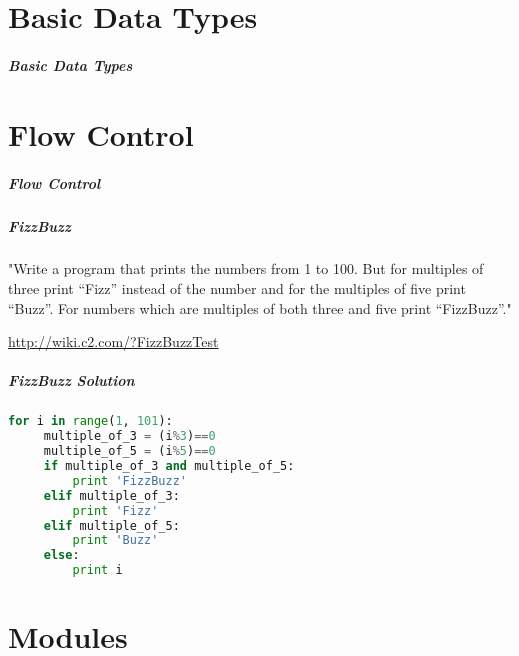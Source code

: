 \documentclass[hyperref={colorlinks, linkcolor=blue, urlcolor=blue}]{beamer}
\begin{document}
\part{Basic Data Types} 

\begin{frame}
  \frametitle{Basic Data Types}
\end{frame}

\part{Flow Control} 

\begin{frame}
  \frametitle{Flow Control}
\end{frame}

\begin{frame}
  \frametitle{FizzBuzz}

  "Write a program that prints the numbers from 1 to 100. But for multiples of three print “Fizz”
  instead of the number and for the multiples of five print “Buzz”. For numbers which are multiples
  of both three and five print “FizzBuzz”."

  \url{http://wiki.c2.com/?FizzBuzzTest}
\end{frame}

\begin{frame}[fragile]
  \frametitle{FizzBuzz Solution}
  \begin{lstlisting}[language=Python]
 for i in range(1, 101):
     multiple_of_3 = (i%3)==0
     multiple_of_5 = (i%5)==0
     if multiple_of_3 and multiple_of_5:
         print 'FizzBuzz'
     elif multiple_of_3:
         print 'Fizz'
     elif multiple_of_5:
         print 'Buzz'
     else:
         print i
  \end{lstlisting}

\end{frame}


\part{Modules} 
\end{document}
